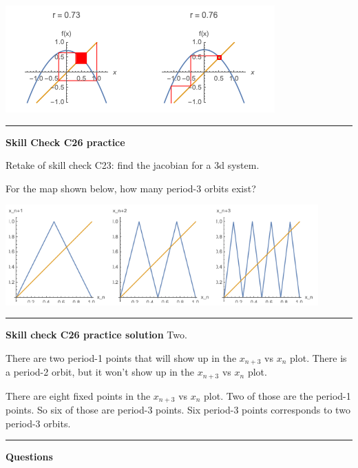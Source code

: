 \documentclass[12pt,letterpaper,noanswers]{exam}
\begin{document}
\includegraphics{img/191105-C26p3.png}


\vspace{0.2cm}
\hrule
\vspace{0.2cm}

\noindent\textbf{Skill Check C26 practice}
\begin{questions}
\item Retake of skill check C23: find the jacobian for a 3d system.

\item For the map shown below, how many period-3 orbits exist?

\includegraphics[width=0.9\textwidth]{img/C25-26p1a.png}

\end{questions}

\vspace{0.2cm}

\hrule
\vspace{0.2cm}

\noindent\textbf{Skill check C26 practice solution}
Two.

There are two period-1 points that will show up in the $x_{n+3}$ vs $x_n$ plot.  There is a period-2 orbit, but it won't show up in the $x_{n+3}$ vs $x_n$ plot.

There are eight fixed points in the $x_{n+3}$ vs $x_n$ plot.  Two of those are the period-1 points.  So six of those are period-3 points.  Six period-3 points corresponds to two period-3 orbits.


\vspace{0.2cm}

\hrule
\vspace{0.2cm}
\noindent\textbf{Questions}
\end{document}
